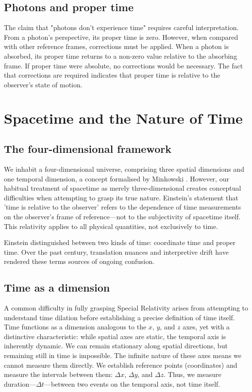 \documentclass[pdflatex,sn-basic]{sn-jnl}
\theoremstyle{thmstyleone}%
\theoremstyle{thmstyletwo}%
\theoremstyle{thmstylethree}%
\begin{document}
	\subsection{Photons and proper time}\label{subsec3_8}
		The claim that "photons don't experience time" requires careful interpretation. From a photon's perspective, its proper time is zero.
However, when compared with other reference frames, corrections must be applied. When a photon is absorbed, its proper time returns to a non-zero value relative to the absorbing frame.
	If proper time were absolute, no corrections would be necessary. The fact that corrections are required indicates that proper time is relative to the observer's state of motion.

\section{Spacetime and the Nature of Time}\label{sec4}
	\subsection{The four-dimensional framework}\label{subsec4_1}
	We inhabit a four-dimensional universe, comprising three spatial dimensions and one temporal dimension, a concept formalised by Minkowski \cite{minkowski1908}. However, our habitual treatment of spacetime as merely three-dimensional creates conceptual difficulties when attempting to grasp its true nature. Einstein's statement that 'time is relative to the observer' \cite{einstein1905} refers to the dependence of time measurements on the observer's frame of reference—not to the subjectivity of spacetime itself. This relativity applies to all physical quantities, not exclusively to time.

	Einstein distinguished between two kinds of time: coordinate time and proper time. Over the past century, translation nuances and interpretive drift have rendered these terms sources of ongoing confusion.
	\subsection{Time as a dimension}\label{subsec4_2}
	A common difficulty in fully grasping Special Relativity arises from attempting to understand time dilation before establishing a precise definition of time itself. 
	Time functions as a dimension analogous to the $x$, $y$, and $z$ axes, yet with a distinctive characteristic: while spatial axes are static, the temporal axis is inherently dynamic. We can remain stationary along spatial directions, but remaining still in time is impossible.
	The infinite nature of these axes means we cannot measure them directly. We establish reference points (coordinates) and measure the intervals between them: $\Delta x$, $\Delta y$, and $\Delta z$. Thus, we measure duration—$\Delta t$—between two events on the temporal axis, not time itself.
\end{document}
